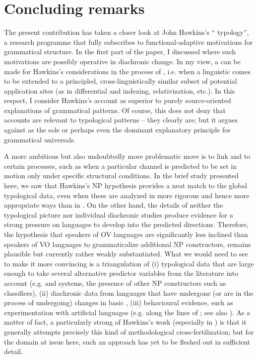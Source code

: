 \documentclass[output=paper]{langsci/langscibook}
\begin{document}
\section{Concluding remarks} 

The present contribution has taken a closer look at John Hawkins’s “ typology”, a research programme that fully subscribes to functional-adaptive motivations for grammatical structure. In the first part of the paper, I discussed where such motivations are possibly operative in diachronic change. In my view, a  can be made for Hawkins’s  considerations in the process of , i.e. when a linguistic  comes to be extended to a principled, cross-linguistically similar subset of potential application sites (as in differential  and indexing, relativization, etc.). In this respect, I consider Hawkins’s account as superior to purely source-oriented explanations of grammatical patterns. Of course, this does not deny that  accounts are relevant to typological patterns – they clearly are; but it argues against  as the sole or perhaps even the dominant explanatory principle for grammatical universals.

A more ambitious but also undoubtedly more problematic move is to link  and  to certain  processes, such as when a particular  channel is predicted to be set in motion only under specific structural conditions. In the brief  study presented here, we saw that Hawkins’s NP  hypothesis provides a neat match to the global typological data, even when these are analyzed in more rigorous and hence more appropriate ways than in \citet{Hawkins2014_VarEff}. On the other hand, the details of neither the typological picture nor individual diachronic studies produce evidence for a strong pressure on languages to develop into the predicted directions. Therefore, the hypothesis that speakers of OV languages are significantly less inclined than speakers of VO languages to grammaticalize additional NP constructors, remains plausible but currently rather weakly substantiated. 
\newpage
What we would need to see to make it more convincing is a triangulation of (i) typological data that are large enough to take several alternative predictor variables from the literature into account (e.g.  and  systems, the presence of other NP constructors such as classifiers), (ii) diachronic data from languages that have undergone (or are in the process of undergoing) changes in basic , (iii) behavioural evidence, such as  experimentation with artificial languages (e.g. along the lines of \citealt{CulbertsonEtAl2012}; see also ). As a matter of fact, a particularly strong  of Hawkins’s work (especially in \citealt{Hawkins2004_Eff,Hawkins2014_VarEff}) is that it generally attempts precisely this kind of methodological cross-fertilization; but for the domain at issue here, such an approach has yet to be fleshed out in sufficient detail.
\end{document}
